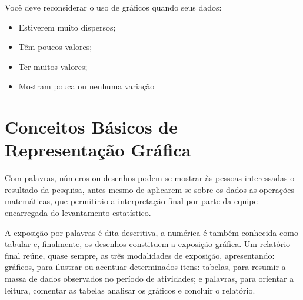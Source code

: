 Você deve reconsiderar o uso de gráficos quando seus dados: 

\begin{itemize}
\item Estiverem muito dispersos; 
\item Têm poucos valores; 
\item Ter muitos valores; 
\item Mostram pouca ou nenhuma variação
\end{itemize}








\newpage
\section{Conceitos Básicos de Representação Gráfica}

\inic Com palavras, números ou desenhos podem-se mostrar às pessoas interessadas o resultado da pesquisa, antes mesmo de aplicarem-se sobre os dados as operações matemáticas, que permitirão a interpretação final por parte da equipe encarregada do levantamento estatístico.\vskip0.3cm

A exposição por palavras é dita descritiva, a numérica é também conhecida como tabular e, finalmente, os desenhos constituem a exposição gráfica. Um relatório final reúne, quase sempre, as três modalidades de exposição, apresentando: gráficos, para ilustrar ou acentuar determinados itens: tabelas, para resumir a massa de dados observados no período de atividades; e palavras, para orientar a leitura, comentar as tabelas analisar os gráficos e concluir o relatório.\vskip0.3cm

